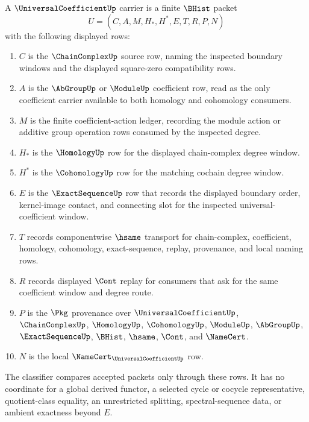\begin{definition}
\label{def:universal-coefficient-carrier}
A $\UniversalCoefficientUp$ carrier is a finite $\BHist$ packet
$$
U=(C,A,M,H_*,H^*,E,T,R,P,N)
$$
with the following displayed rows:
\begin{enumerate}
\item $C$ is the $\ChainComplexUp$ source row, naming the inspected boundary windows and the displayed square-zero compatibility rows.
\item $A$ is the $\AbGroupUp$ or $\ModuleUp$ coefficient row, read as the only coefficient carrier available to both homology and cohomology consumers.
\item $M$ is the finite coefficient-action ledger, recording the module action or additive group operation rows consumed by the inspected degree.
\item $H_*$ is the $\HomologyUp$ row for the displayed chain-complex degree window.
\item $H^*$ is the $\CohomologyUp$ row for the matching cochain degree window.
\item $E$ is the $\ExactSequenceUp$ row that records the displayed boundary order, kernel-image contact, and connecting slot for the inspected universal-coefficient window.
\item $T$ records componentwise $\hsame$ transport for chain-complex, coefficient, homology, cohomology, exact-sequence, replay, provenance, and local naming rows.
\item $R$ records displayed $\Cont$ replay for consumers that ask for the same coefficient window and degree route.
\item $P$ is the $\Pkg$ provenance over $\UniversalCoefficientUp$, $\ChainComplexUp$, $\HomologyUp$, $\CohomologyUp$, $\ModuleUp$, $\AbGroupUp$, $\ExactSequenceUp$, $\BHist$, $\hsame$, $\Cont$, and $\NameCert$.
\item $N$ is the local $\NameCert_{\UniversalCoefficientUp}$ row.
\end{enumerate}
The classifier compares accepted packets only through these rows. It has no coordinate for a global derived functor, a selected cycle or cocycle representative, quotient-class equality, an unrestricted splitting, spectral-sequence data, or ambient exactness beyond $E$.
\end{definition}

